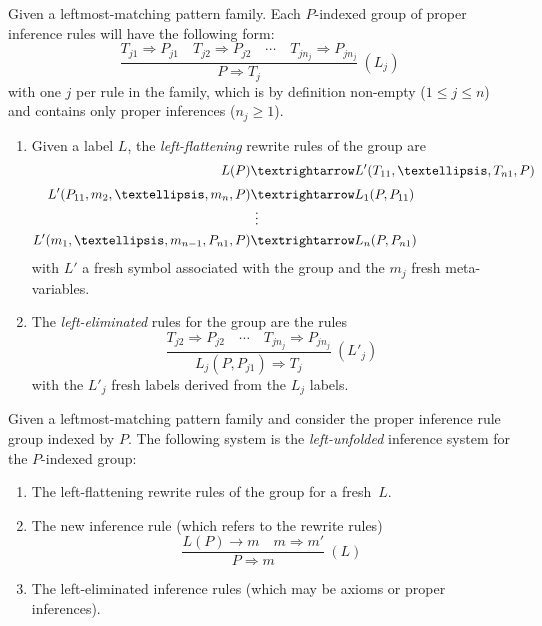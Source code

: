 \documentclass[letterpaper,11pt]{article}
\begin{document}
\begin{definition}
  Given a leftmost-matching pattern family. Each $P$-indexed group of proper inference rules will
  have the following form:
  \begin{displaymath}
    \dfrac{ T_{j1} ⇒ P_{j1} \quad T_{j2} ⇒ P_{j2} \quad\cdots\quad T_{jn_j} ⇒ P_{jn_j} }{ P ⇒ T_j } ~ (L_j)
  \end{displaymath}
  with one $j$ per rule in the family, which is by definition non-empty ($1≤j≤n$) and contains only
  proper inferences ($n_j≥1$).
  \begin{enumerate}

  \item Given a label $L$, the \emph{left-flattening} rewrite rules of the group are
    \begin{align*}
      L(P) &→ L'(T_{11}, …,T_{n1}, P) \\[\jot]
      L'(P_{11}, m_2, …, m_n, P) &→ L_1(P, P_{11}) \\[-\jot]
      &~\vdots\\
      L'(m_1, …, m_{n-1}, P_{n1}, P) &→ L_n(P, P_{n1})
    \end{align*}
    with $L'$ a fresh symbol associated with the group and the $m_j$ fresh meta-variables.

  \item The \emph{left-eliminated} rules for the group are the rules
    \begin{displaymath}
      \dfrac{ T_{j2} ⇒ P_{j2} \quad\cdots\quad T_{jn_j} ⇒ P_{jn_j} }{ L_j(P, P_{j1}) ⇒ T_j } ~ (L'_j)
    \end{displaymath}
    with the $L'_j$ fresh labels derived from the $L_j$ labels.

  \end{enumerate}
\end{definition}

\begin{definition}
  Given a leftmost-matching pattern family and consider the proper inference rule group indexed by
  $P$. The following system is the \emph{left-unfolded} inference system for the $P$-indexed group:
  \begin{enumerate}

  \item The left-flattening rewrite rules of the group for a fresh~$L$.

  \item The new inference rule (which refers to the rewrite rules)
    \begin{displaymath}
      \dfrac{ L(P) → m \quad m ⇒ m' }{ P ⇒ m } ~ (L)
    \end{displaymath}

  \item The left-eliminated inference rules (which may be axioms or proper inferences).

  \end{enumerate}
\end{definition}
\end{document}

